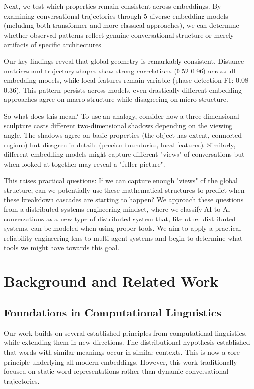 \documentclass[11pt,letterpaper]{article}
\newcommand{\numEmbeddingModels}{5}
\begin{document}
Next, we test which properties remain consistent across embeddings. By examining conversational trajectories through \numEmbeddingModels{} diverse embedding models (including both transformer and more classical approaches), we can determine whether observed patterns reflect genuine conversational structure or merely artifacts of specific architectures.

Our key findings reveal that global geometry is remarkably consistent. Distance matrices and trajectory shapes show strong correlations (0.52-0.96) across all embedding models, while local features remain variable (phase detection F1: 0.08-0.36). This pattern persists across models, even drastically different embedding approaches agree on macro-structure while disagreeing on micro-structure.

So what does this mean? To use an analogy, consider how a three-dimensional sculpture casts different two-dimensional shadows depending on the viewing angle. The shadows agree on basic properties (the object has extent, connected regions) but disagree in details (precise boundaries, local features). Similarly, different embedding models might capture different "views" of conversations but when looked at together may reveal a "fuller picture".

This raises practical questions: If we can capture enough "views" of the global structure, can we potentially use these mathematical structures to predict when these breakdown cascades are starting to happen? We approach these questions from a distributed systems engineering mindset, where we classify AI-to-AI conversations as a new type of distributed system that, like other distributed systems, can be modeled when using proper tools. We aim to apply a practical reliability engineering lens to multi-agent systems and begin to determine what tools we might have towards this goal. 


\section{Background and Related Work}

\subsection{Foundations in Computational Linguistics}

Our work builds on several established principles from computational linguistics, while extending them in new directions. The distributional hypothesis \citep{harris1954distributional, firth1957papers} established that words with similar meanings occur in similar contexts. This is now a core principle underlying all modern embeddings. However, this work traditionally focused on static word representations rather than dynamic conversational trajectories.
\end{document}
